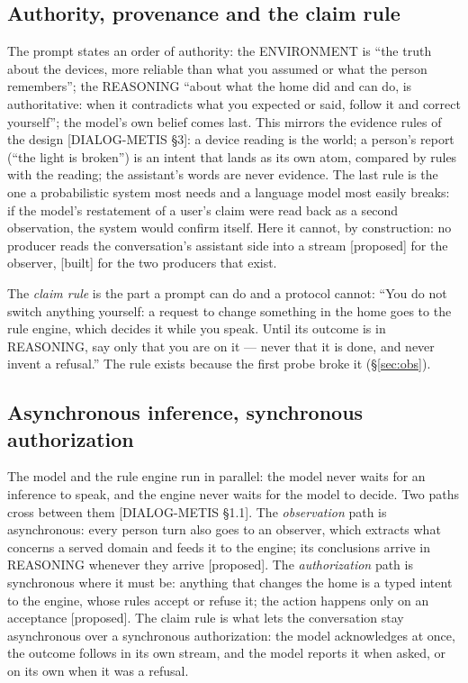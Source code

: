 \documentclass[11pt]{article}
\newcommand{\src}[1]{{\footnotesize\textsf{[#1]}}}
\newcommand{\built}{\textsf{\small[built]}}
\newcommand{\proposed}{\textsf{\small[proposed]}}
\begin{document}
\subsection{Authority, provenance and the claim rule}

The prompt states an order of authority: the ENVIRONMENT is ``the truth about the devices,
more reliable than what you assumed or what the person remembers''; the REASONING ``about
what the home did and can do, is authoritative: when it contradicts what you expected or
said, follow it and correct yourself''; the model's own belief comes last. This mirrors the
evidence rules of the design \src{DIALOG-METIS \S3}: a device reading is the world; a
person's report (``the light is broken'') is an intent that lands as its own atom, compared
by rules with the reading; the assistant's words are never evidence. The last rule is the
one a probabilistic system most needs and a language model most easily breaks: if the
model's restatement of a user's claim were read back as a second observation, the system
would confirm itself. Here it cannot, by construction: no producer reads the conversation's
assistant side into a stream \proposed{} for the observer, \built{} for the two producers
that exist.

The \emph{claim rule} is the part a prompt can do and a protocol cannot: ``You do not switch
anything yourself: a request to change something in the home goes to the rule engine, which
decides it while you speak. Until its outcome is in REASONING, say only that you are on it
--- never that it is done, and never invent a refusal.'' The rule exists because the first
probe broke it (\S\ref{sec:obs}).

\subsection{Asynchronous inference, synchronous authorization}

The model and the rule engine run in parallel: the model never waits for an inference to
speak, and the engine never waits for the model to decide. Two paths cross between them
\src{DIALOG-METIS \S1.1}. The \emph{observation} path is asynchronous: every person turn also
goes to an observer, which extracts what concerns a served domain and feeds it to the
engine; its conclusions arrive in REASONING whenever they arrive \proposed. The
\emph{authorization} path is synchronous where it must be: anything that changes the home
is a typed intent to the engine, whose rules accept or refuse it; the action happens only on
an acceptance \proposed. The claim rule is what lets the conversation stay asynchronous over
a synchronous authorization: the model acknowledges at once, the outcome follows in its own
stream, and the model reports it when asked, or on its own when it was a refusal.
\end{document}
